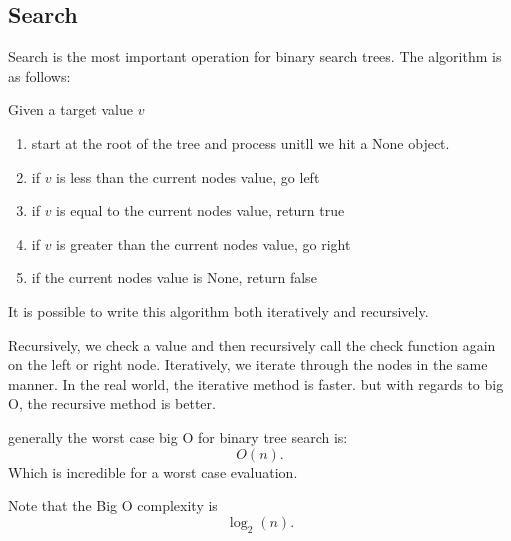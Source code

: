 \documentclass[12pt]{book}
\begin{document}
\subsection*{Search}
Search is the most important operation for binary search trees.
The algorithm is as follows:

Given a target value $v$
\begin{enumerate}
        \item start at the root of the tree and process unitll we hit a None object.
        \item if $v$ is less than the current nodes value, go left
        \item if  $v$ is equal to the current nodes value, return true
        \item if  $v$ is greater than the current nodes value, go right
        \item if the current nodes value is None, return false
\end{enumerate}

It is possible to write this algorithm both iteratively and recursively.

Recursively, we check a value and then recursively call the check function again on the left or right node.
Iteratively, we iterate through the nodes in the same manner.
In the real world, the iterative method is faster.
but with regards to big O, the recursive method is better.

generally the worst case big O for binary tree search is:
\[
O(n)
.\] 
Which is incredible for a worst case evaluation.

Note that the Big O complexity is \[
\log_2(n)
.\] 
\end{document}
